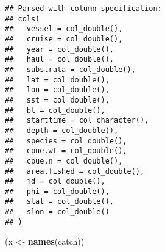 \documentclass[
]{article}
\newenvironment{Shaded}{\begin{snugshade}}{\end{snugshade}}
\newcommand{\CommentTok}[1]{\textcolor[rgb]{0.56,0.35,0.01}{\textit{#1}}}
\newcommand{\DataTypeTok}[1]{\textcolor[rgb]{0.13,0.29,0.53}{#1}}
\newcommand{\DecValTok}[1]{\textcolor[rgb]{0.00,0.00,0.81}{#1}}
\newcommand{\KeywordTok}[1]{\textcolor[rgb]{0.13,0.29,0.53}{\textbf{#1}}}
\newcommand{\NormalTok}[1]{#1}
\newcommand{\OperatorTok}[1]{\textcolor[rgb]{0.81,0.36,0.00}{\textbf{#1}}}
\newcommand{\StringTok}[1]{\textcolor[rgb]{0.31,0.60,0.02}{#1}}
\begin{document}
\begin{verbatim}
## Parsed with column specification:
## cols(
##   vessel = col_double(),
##   cruise = col_double(),
##   year = col_double(),
##   haul = col_double(),
##   substrata = col_double(),
##   lat = col_double(),
##   lon = col_double(),
##   sst = col_double(),
##   bt = col_double(),
##   starttime = col_character(),
##   depth = col_double(),
##   species = col_double(),
##   cpue.wt = col_double(),
##   cpue.n = col_double(),
##   area.fished = col_double(),
##   jd = col_double(),
##   phi = col_double(),
##   slat = col_double(),
##   slon = col_double()
## )
\end{verbatim}

\begin{Shaded}
\end{Shaded}

\begin{Shaded}
\begin{Highlighting}[]
\NormalTok{(x <-}\StringTok{ }\KeywordTok{names}\NormalTok{(catch))}
\end{Highlighting}
\end{Shaded}
\end{document}
